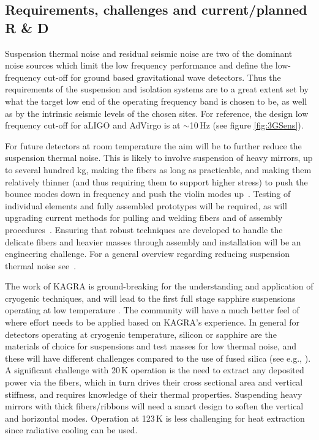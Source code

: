 \begin{samepage}
\section{Requirements, challenges and current/planned R \& D}
Suspension thermal noise and residual seismic noise are two of the dominant noise sources which limit the low frequency performance and define the low-frequency cut-off for ground based gravitational wave detectors. Thus the requirements of the suspension and isolation systems are to a great extent set by what the target low end of the operating frequency band is chosen to be, as well as by the intrinsic seismic levels of the chosen sites.
For reference, the design low frequency cut-off for aLIGO and AdVirgo is at $\sim$10\,Hz (see figure \ref{fig:3GSens}).

\end{samepage} %


 For future detectors at room temperature the aim will be to further reduce the suspension thermal noise. This is likely to involve suspension of heavy mirrors, up to several hundred kg, making the fibers as long as practicable, and making them relatively thinner (and thus requiring them to support higher stress) to push the bounce modes down in frequency and push the violin modes up~\cite{Heptonstall:2014, Bell:2014,aisa:2016advanced, Tokmakov:2012, Amico:2002_monolithic}.  Testing of individual elements and fully assembled prototypes will be required, as will upgrading current methods for pulling and welding fibers and of assembly procedures~\cite{Hammond:2014,Travasso:2018}. Ensuring that robust techniques are developed to handle the delicate fibers and heavier masses through assembly and installation will be an engineering challenge. For a general overview regarding reducing suspension thermal noise see~\cite{Hammond:2014, Hammond:2012}.

The work of KAGRA is ground-breaking for the understanding and application of cryogenic techniques, and will lead to the first full stage sapphire suspensions operating at low temperature \cite{Kumar:2016_KAGRA}. The community will have a much better feel of where effort needs to be applied based on KAGRA's experience.
In general for detectors operating at cryogenic temperature, silicon or sapphire are the materials of choice for suspensions and test masses for low thermal noise, and these will have different challenges compared to the use of fused silica (see e.g., \cite{Cumming:2014Silicon, nawrodt:2013,Haughian:2016, Alshourbagy:2006_thermoelastic, Alshourbagy:2006,amico:2004, Cumming:2014Silicon, Alshourbagy:2005}). A significant challenge with 20\,K operation is the need to extract any deposited power via the fibers, which in turn drives their cross sectional area and vertical stiffness, and requires knowledge of their thermal properties. Suspending heavy mirrors with thick fibers/ribbons will need a smart design to soften the vertical and horizontal modes. Operation at 123\,K is less challenging for heat extraction since radiative cooling can be used.

